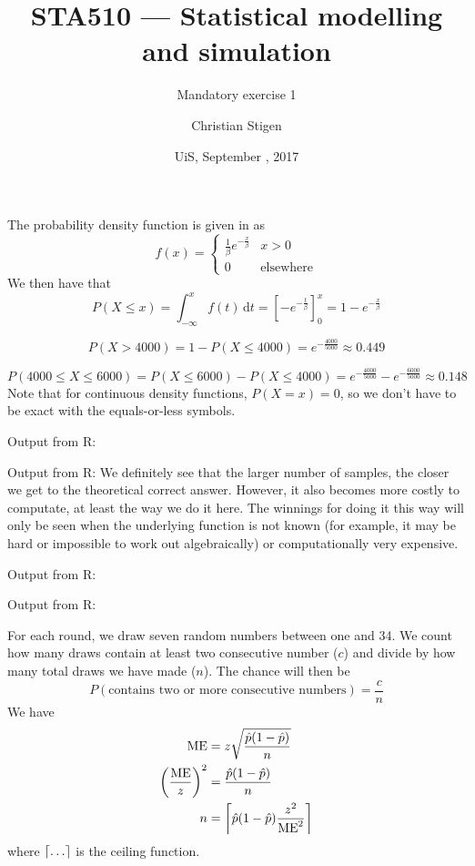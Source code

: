 \documentclass[a4paper,english,12pt]{article}
\title{STA510 --- Statistical modelling and simulation}
\subtitle{Mandatory exercise 1}
\author{Christian Stigen}
\date{UiS, September \nth{21}, 2017}
\begin{document}
\maketitle

The probability density function is given in \cite{walpole} as
\[
  f(x) =
    \begin{cases}
      \displaystyle
        \frac{1}{\beta} e^{-\frac{x}{\beta}} & x > 0  \\
        0 & \text{elsewhere}
    \end{cases}
\]
We then have that
\[
  P(X \leqslant x) = \int_{-\infty}^{x} f(t)\, \mathrm{d}t 
    = \left[ -e^{-\frac{t}{\beta}} \right]_{0}^{x} = 1 - e^{-\frac{x}{\beta}}
\]

\[
  P(X > 4000) = 1 - P(X \leqslant 4000) = e^{-\frac{4000}{5000}} \approx 0.449
\]

\[
  P(4000 \leqslant X \leqslant 6000) =
    P(X \leqslant 6000) - P(X \leqslant 4000) =
       e^{-\frac{4000}{5000}} - e^{-\frac{6000}{5000}}
       \approx 0.148
\]
Note that for continuous density functions, $P(X=x) = 0$, so we don't have
to be exact with the equals-or-less symbols.

Output from R:

Output from R:
We definitely see that the larger number of samples, the closer we
get to the theoretical correct answer. However, it also becomes more costly
to computate, at least the way we do it here. The winnings for doing it this
way will only be seen when the underlying function is not known (for example,
it may be hard or impossible to work out algebraically) or computationally very
expensive.

Output from R:

Output from R:

For each round, we draw seven random numbers between one and 34. We count how
many draws contain at least two consecutive number ($c$) and divide by how many
total draws we have made ($n$). The chance will then be
\[
  P(\text{contains two or more consecutive numbers}) = \frac{c}{n}
\]
We have
\begin{align*}
  \text{ME} &= z\sqrt{\frac{\hat{p}(1-\hat{p})}{n}} \\
  \left(\frac{\text{ME}}{z}\right)^2 &= \frac{\hat{p}(1-\hat{p})}{n} \\
  n &= \ceil*{ \hat{p}(1-\hat{p}) \frac{z^2}{\text{ME}^2} }
\end{align*}
where $\ceil{\dots}$ is the ceiling function.
\end{document}
